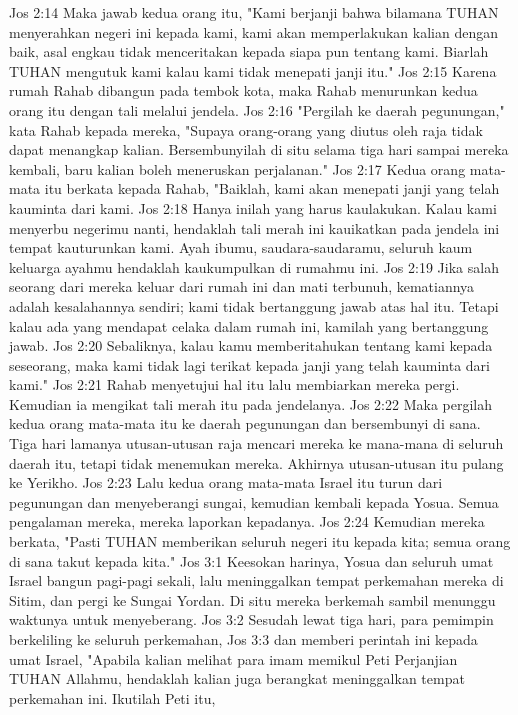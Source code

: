 Jos 2:14  Maka jawab kedua orang itu, "Kami berjanji bahwa bilamana TUHAN menyerahkan negeri ini kepada kami, kami akan memperlakukan kalian dengan baik, asal engkau tidak menceritakan kepada siapa pun tentang kami. Biarlah TUHAN mengutuk kami kalau kami tidak menepati janji itu."
Jos 2:15  Karena rumah Rahab dibangun pada tembok kota, maka Rahab menurunkan kedua orang itu dengan tali melalui jendela.
Jos 2:16  "Pergilah ke daerah pegunungan," kata Rahab kepada mereka, "Supaya orang-orang yang diutus oleh raja tidak dapat menangkap kalian. Bersembunyilah di situ selama tiga hari sampai mereka kembali, baru kalian boleh meneruskan perjalanan."
Jos 2:17  Kedua orang mata-mata itu berkata kepada Rahab, "Baiklah, kami akan menepati janji yang telah kauminta dari kami.
Jos 2:18  Hanya inilah yang harus kaulakukan. Kalau kami menyerbu negerimu nanti, hendaklah tali merah ini kauikatkan pada jendela ini tempat kauturunkan kami. Ayah ibumu, saudara-saudaramu, seluruh kaum keluarga ayahmu hendaklah kaukumpulkan di rumahmu ini.
Jos 2:19  Jika salah seorang dari mereka keluar dari rumah ini dan mati terbunuh, kematiannya adalah kesalahannya sendiri; kami tidak bertanggung jawab atas hal itu. Tetapi kalau ada yang mendapat celaka dalam rumah ini, kamilah yang bertanggung jawab.
Jos 2:20  Sebaliknya, kalau kamu memberitahukan tentang kami kepada seseorang, maka kami tidak lagi terikat kepada janji yang telah kauminta dari kami."
Jos 2:21  Rahab menyetujui hal itu lalu membiarkan mereka pergi. Kemudian ia mengikat tali merah itu pada jendelanya.
Jos 2:22  Maka pergilah kedua orang mata-mata itu ke daerah pegunungan dan bersembunyi di sana. Tiga hari lamanya utusan-utusan raja mencari mereka ke mana-mana di seluruh daerah itu, tetapi tidak menemukan mereka. Akhirnya utusan-utusan itu pulang ke Yerikho.
Jos 2:23  Lalu kedua orang mata-mata Israel itu turun dari pegunungan dan menyeberangi sungai, kemudian kembali kepada Yosua. Semua pengalaman mereka, mereka laporkan kepadanya.
Jos 2:24  Kemudian mereka berkata, "Pasti TUHAN memberikan seluruh negeri itu kepada kita; semua orang di sana takut kepada kita."
Jos 3:1  Keesokan harinya, Yosua dan seluruh umat Israel bangun pagi-pagi sekali, lalu meninggalkan tempat perkemahan mereka di Sitim, dan pergi ke Sungai Yordan. Di situ mereka berkemah sambil menunggu waktunya untuk menyeberang.
Jos 3:2  Sesudah lewat tiga hari, para pemimpin berkeliling ke seluruh perkemahan,
Jos 3:3  dan memberi perintah ini kepada umat Israel, "Apabila kalian melihat para imam memikul Peti Perjanjian TUHAN Allahmu, hendaklah kalian juga berangkat meninggalkan tempat perkemahan ini. Ikutilah Peti itu,
